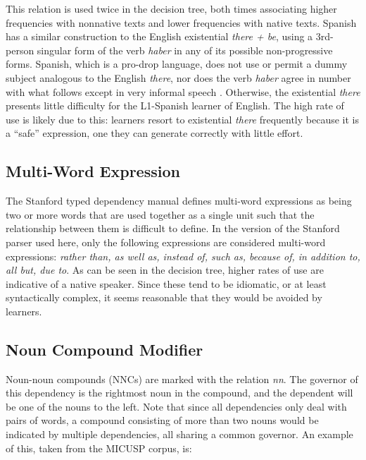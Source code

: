 \documentclass[main.tex]{subfiles}
\begin{document}
This relation is used twice in the decision tree, both times associating higher frequencies with nonnative texts and lower frequencies with native texts. Spanish has a similar construction to the English existential \textit{there + be}, using a 3rd-person singular form of the verb \textit{haber} in any of its possible non-progressive forms. Spanish, which is a pro-drop language, does not use or permit a dummy subject analogous to the English \textit{there}, nor does the verb \textit{haber} agree in number with what follows except in very informal speech \citep[pp. 429-32]{butt}. Otherwise, the existential \textit{there} presents little difficulty for the L1-Spanish learner of English. The high rate of use is likely due to this: learners resort to existential \textit{there} frequently because it is a ``safe'' expression, one they can generate correctly with little effort.

\subsection{Multi-Word Expression}

The Stanford typed dependency manual \citep{typed-deps-manual} defines multi-word expressions as being two or more words that are used together as a single unit such that the relationship between them is difficult to define. In the version of the Stanford parser used here, only the following expressions are considered multi-word expressions: \textit{rather than, as well as, instead of, such as, because of, in addition to, all but, due to}. As can be seen in the decision tree, higher rates of use are indicative of a native speaker. Since these tend to be idiomatic, or at least syntactically complex, it seems reasonable that they would be avoided by learners.

\subsection{Noun Compound Modifier}
\label{sub:nn}

Noun-noun compounds (NNCs) are marked with the relation \textit{nn}. The governor of this dependency is the rightmost noun in the compound, and the dependent will be one of the nouns to the left. Note that since all dependencies only deal with pairs of words, a compound consisting of more than two nouns would be indicated by multiple dependencies, all sharing a common governor. An example of this, taken from the MICUSP corpus, is:
\newline\newline{}
\newline
\end{document}
